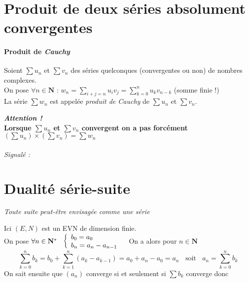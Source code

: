 \section{Produit de deux séries absolument convergentes}

		\vspace{-15pt}
		\traitd
		\paragraph{Produit de \emph{Cauchy}}
			Soient $\sum u_n$ et $\sum v_n$ des séries quelconques (convergentes ou non) de nombres complexes.\\
			On pose $\forall n \in \mathbf{N}$ : $w_n = \sum\limits_{i+j=n} u_i v_j = \sum_{k=0}^{n} u_k v_{n-k}$ (somme finie !) \\
			La série $\sum w_n$ est appelée \emph{produit de \emph{Cauchy}} de $\sum u_n$ et $\sum v_n$.
		\trait
				
		\textbf{\emph{Attention !} \\Lorsque $\sum u_n$ et $\sum v_n$ convergent on a pas forcément 
			$\left(\sum u_n \right) \times \left(\sum v_n \right) = \sum w_n$} \medskip \\
		
		 \medskip \\

		\textit{\small Signalé :} \\


		\medskip

	\section{Dualité série-suite}
		
		\textit{Toute suite peut-être envisagée comme une série}
			
		Ici $(E,N)$ est un EVN de dimension finie.\\${}$ \\On pose $\forall n\in\mathbf{N}^* ~~ \left\{ \begin{array}{l}  b_0 = a_0 \\ b_n = a_n - a_{n-1} \end{array}
			\right.~~$ On a alors pour $n\in \mathbf{N}$ \\
			\[ \sum_{k=0}^{n} b_k = b_0 + \sum_{k=1}^{n} (a_k - a_{k-1} ) = a_0 +a_n - a_0 = a_n ~~~~\mathrm{soit} ~~~~ a_n = \sum_{k=0}^{n} b_k\]
			On sait ensuite que $(a_n)$ converge si et seulement si $\sum b_k$ converge donc 
			
		\begin{center}
		\end{center} \medskip
		

\fin